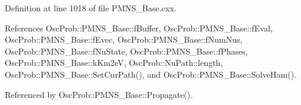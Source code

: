 Definition at line 1018 of file P\+M\+N\+S\+\_\+\+Base.\+cxx.



References Osc\+Prob\+::\+P\+M\+N\+S\+\_\+\+Base\+::f\+Buffer, Osc\+Prob\+::\+P\+M\+N\+S\+\_\+\+Base\+::f\+Eval, Osc\+Prob\+::\+P\+M\+N\+S\+\_\+\+Base\+::f\+Evec, Osc\+Prob\+::\+P\+M\+N\+S\+\_\+\+Base\+::f\+Num\+Nus, Osc\+Prob\+::\+P\+M\+N\+S\+\_\+\+Base\+::f\+Nu\+State, Osc\+Prob\+::\+P\+M\+N\+S\+\_\+\+Base\+::f\+Phases, Osc\+Prob\+::\+P\+M\+N\+S\+\_\+\+Base\+::k\+Km2eV, Osc\+Prob\+::\+Nu\+Path\+::length, Osc\+Prob\+::\+P\+M\+N\+S\+\_\+\+Base\+::\+Set\+Cur\+Path(), and Osc\+Prob\+::\+P\+M\+N\+S\+\_\+\+Base\+::\+Solve\+Ham().



Referenced by Osc\+Prob\+::\+P\+M\+N\+S\+\_\+\+Base\+::\+Propagate().


